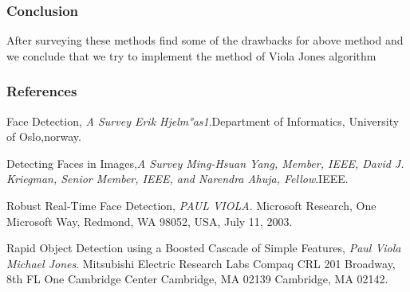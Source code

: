 \documentclass{beamer}
\begin{document}
\begin{frame}
\frametitle{Conclusion}
After surveying these methods find some of the drawbacks for above method and we conclude that we try to implement the method of Viola Jones algorithm
\end{frame}

\begin{frame}

\frametitle{References}
\begin{thebibliography}{4}

Face Detection,
\emph{A Survey Erik Hjelm°as1}.Department of Informatics, University of Oslo,norway.


Detecting Faces in Images,\emph{A Survey Ming-Hsuan Yang, Member, IEEE, David J. Kriegman, Senior Member, IEEE, and Narendra Ahuja, Fellow}.IEEE.
 
Robust Real-Time Face Detection,
\emph{PAUL VIOLA}. Microsoft Research, One Microsoft Way, Redmond, WA 98052, USA, July 11, 2003.
 
Rapid Object Detection using a Boosted Cascade of Simple
Features,
\emph{Paul Viola Michael Jones}. Mitsubishi Electric Research Labs Compaq CRL 201 Broadway, 8th FL One Cambridge Center Cambridge, MA 02139 Cambridge, MA 02142.
  
\end{thebibliography}

\end{frame}
\end{document}
